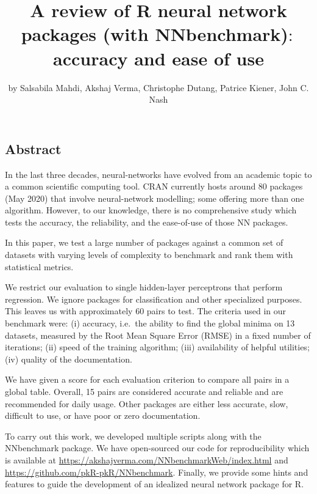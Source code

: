 \title{A review of R neural network packages (with NNbenchmark)\(:\) accuracy
and ease of use}
\author{by Salsabila Mahdi, Akshaj Verma, Christophe Dutang, Patrice Kiener, John C. Nash}

\maketitle


\hypertarget{abstract}{%
\subsection{Abstract}\label{abstract}}

In the last three decades, neural-networks have evolved from an academic
topic to a common scientific computing tool. CRAN currently hosts around
80 packages (May 2020) that involve neural-network modelling; some
offering more than one algorithm. However, to our knowledge, there is no
comprehensive study which tests the accuracy, the reliability, and the
ease-of-use of those NN packages.

In this paper, we test a large number of packages against a common set
of datasets with varying levels of complexity to benchmark and rank them
with statistical metrics.

We restrict our evaluation to single hidden-layer perceptrons that
perform regression. We ignore packages for classification and other
specialized purposes. This leaves us with approximately 60
 pairs to test. The criteria used in our
benchmark were: (i) accuracy, i.e.~the ability to find the global minima
on 13 datasets, measured by the Root Mean Square Error (RMSE) in a fixed
number of iterations; (ii) speed of the training algorithm; (iii)
availability of helpful utilities; (iv) quality of the documentation.

We have given a score for each evaluation criterion to compare all
 pairs in a global table. Overall, 15 pairs are
considered accurate and reliable and are recommended for daily usage.
Other packages are either less accurate, slow, difficult to use, or have
poor or zero documentation.

To carry out this work, we developed multiple scripts along with the
NNbenchmark package. We have open-sourced our code for reproducibility
which is available at
\url{https://akshajverma.com/NNbenchmarkWeb/index.html} and
\url{https://github.com/pkR-pkR/NNbenchmark}. Finally, we provide some
hints and features to guide the development of an idealized neural
network package for R.

